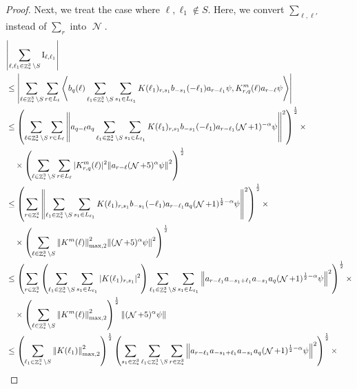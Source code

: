\documentclass[sn-mathphys, Numbered ,a4paper]{sn-jnl}%
\DeclareMathOperator{\Z}{\mathbb{Z}}
\DeclareMathOperator{\NN}{\mathcal{N}}
\newcommand{\eva}[1]{\left\langle #1 \right\rangle}
\newcommand{\I}{\mathrm{I}}
\theoremstyle{plain}
\theoremstyle{definition}
\theoremstyle{remark}
\theoremstyle{plain}
\theoremstyle{definition}
\theoremstyle{remark}
\begin{document}
\begin{proof}
Next, we treat the case where $ \ell, \ell_1 \notin S $. Here, we convert $ \sum_{\ell, \ell'} $ instead of $ \sum_r $ into $ \NN $.
\begin{align}
	&\abs{\sum_{\ell, \ell_1 \in \Z^3_* \setminus S} \I_{\ell,\ell_1}} \nonumber\\
    &\leq \abs{ \sum_{\ell \in \Z^3_* \setminus S} \sum\limits_{r \in L_\ell} \eva{ b_{q}(\ell)
    		\sum\limits_{\ell_1 \in \Z^3_* \setminus S}  \sum\limits_{s_1 \in L_{\ell_1}} K(\ell_1)_{r,s_1} b_{-s_1}(-\ell_1) a_{r-\ell_1} \psi, 
    		 K^m_{r,q}(\ell) a_{r-\ell} \psi }}\nonumber\\
    &\leq \left( \sum_{\ell \in \Z^3_* \setminus S} \sum_{r \in L_\ell}
    		\norm{a_{q-\ell} a_q \sum\limits_{\ell_1 \in \Z^3_* \setminus S} \sum_{s_1 \in L_{\ell_1}} K(\ell_1)_{r,s_1} b_{-s_1}(-\ell_1) a_{r-\ell_1} (\NN+1)^{-\alpha} \psi}^2 \right)^{\frac 12} \times \nonumber\\
    	&\quad \times \left( \sum_{\ell \in \Z^3_* \setminus S} \sum\limits_{r \in L_\ell} 
    		|K^m_{r,q}(\ell)|^2 \norm{  a_{r-\ell} (\NN+5)^{\alpha}\psi }^2 \right)^{\frac 12} \nonumber\\
    	&\leq \left( \sum_{r \in \Z^3_*}
    		\norm{\sum\limits_{\ell_1 \in \Z^3_* \setminus S} \sum_{s_1 \in L_{\ell_1}} K(\ell_1)_{r,s_1} b_{-s_1}(-\ell_1) a_{r-\ell_1} a_q (\NN+1)^{\frac 12-\alpha} \psi}^2 \right)^{\frac 12} \times \nonumber\\
    	&\quad \times \left( \sum_{\ell \in \Z^3_* \setminus S} \norm{K^m(\ell)}_{\max,2}^2
    		\norm{ (\NN+5)^{\alpha}\psi }^2 \right)^{\frac 12} \nonumber\\
    &\leq \left( \sum_{r \in \Z^3_*} \left(  \sum\limits_{\ell_1 \in \Z^3_* \setminus S} \sum_{s_1 \in L_{\ell_1}} |K(\ell_1)_{r,s_1}|^2 \right)
    		\sum\limits_{\ell_1 \in \Z^3_* \setminus S} \sum_{s_1 \in L_{\ell_1}} 
    		\norm{ a_{r-\ell_1} a_{-s_1+\ell_1} a_{-s_1}  a_q (\NN+1)^{\frac 12-\alpha} \psi}^2 \right)^{\frac 12} \times \nonumber\\
    	&\quad \times \left( \sum_{\ell \in \Z^3_* \setminus S} \norm{K^m(\ell)}_{\max,2}^2 \right)^{\frac 12}
    		\norm{ (\NN+5)^{\alpha}\psi }  \nonumber\\
    	&\leq \left( \sum_{\ell_1 \in \Z^3_* \setminus S} \norm{K(\ell_1)}_{\max,2}^2 \right)^{\frac 12}
    		\left(
    		\sum_{s_1 \in \Z^3_*} \sum\limits_{\ell_1 \in \Z^3_* \setminus S} \sum_{r \in \Z^3_*}
    		\norm{ a_{r-\ell_1} a_{-s_1+\ell_1} a_{-s_1}  a_q (\NN+1)^{\frac 12-\alpha} \psi}^2 \right)^{\frac 12} \times \nonumber\\

\end{align}
\end{proof}
\end{document}
